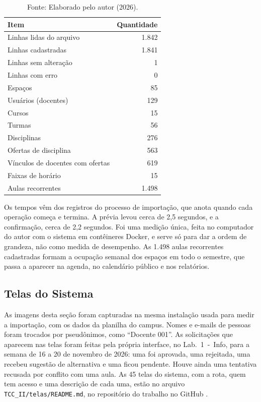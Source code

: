 \begin{table}[!htb]
	\centering
	\caption{Resultado da importação da planilha de horários}
	\begin{tabular}{@{}>{\raggedright\arraybackslash}p{9.0cm}r@{}}
	\hline
		\textbf{Item} & \textbf{Quantidade} \\ \hline
		Linhas lidas do arquivo & 1.842 \\
		Linhas cadastradas & 1.841 \\
		Linhas sem alteração & 1 \\
		Linhas com erro & 0 \\ \hline
		Espaços & 85 \\
		Usuários (docentes) & 129 \\
		Cursos & 15 \\
		Turmas & 56 \\
		Disciplinas & 276 \\
		Ofertas de disciplina & 563 \\
		Vínculos de docentes com ofertas & 619 \\
		Faixas de horário & 15 \\
		Aulas recorrentes & 1.498 \\ \hline
	\end{tabular}
	\caption*{Fonte: Elaborado pelo autor (2026).}
	\label{tab:importacao}
\end{table}

Os tempos vêm dos registros do processo de importação, que anota quando cada operação começa e termina. A prévia levou cerca de 2,5 segundos, e a confirmação, cerca de 2,2 segundos. Foi uma medição única, feita no computador do autor com o sistema em contêineres Docker, e serve só para dar a ordem de grandeza, não como medida de desempenho. As 1.498 aulas recorrentes cadastradas formam a ocupação semanal dos espaços em todo o semestre, que passa a aparecer na agenda, no calendário público e nos relatórios.

\subsection{Telas do Sistema}
\label{sec:resultado-telas}

As imagens desta seção foram capturadas na mesma instalação usada para medir a importação, com os dados da planilha do campus. Nomes e e-mails de pessoas foram trocados por pseudônimos, como ``Docente 001''. As solicitações que aparecem nas telas foram feitas pela própria interface, no \mbox{Lab.~1 - Info}, para a semana de 16 a 20 de novembro de 2026: uma foi aprovada, uma rejeitada, uma recebeu sugestão de alternativa e uma ficou pendente. Houve ainda uma tentativa recusada por conflito com uma aula. As 45 telas do sistema, com a rota, quem tem acesso e uma descrição de cada uma, estão no arquivo \texttt{TCC\_II/telas/README.md}, no repositório do trabalho no GitHub \cite{goncalves2026ifagenda}.

